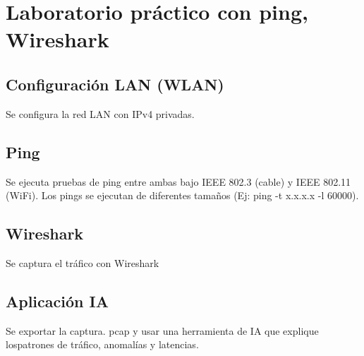 \section{Laboratorio práctico con ping, Wireshark}
\subsection{Configuración LAN (WLAN)}
Se configura la red LAN con IPv4 privadas.

\subsection{Ping}
Se ejecuta pruebas de ping entre ambas bajo IEEE 802.3 (cable) y IEEE 802.11 (WiFi). Los pings se ejecutan de diferentes tamaños (Ej: ping -t x.x.x.x -l 60000).

\subsection{Wireshark}
Se captura el tráfico con Wireshark


\subsection{Aplicación IA}
Se exportar la captura. pcap y usar una herramienta de IA que explique lospatrones de tráfico, anomalías y latencias.
